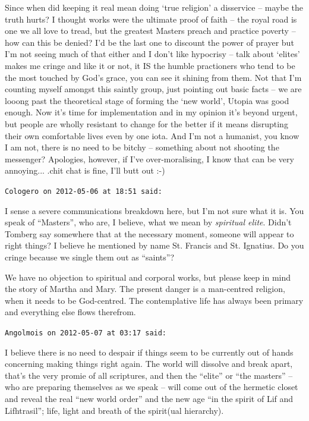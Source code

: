 \begin{footnotesize}
\begin{sffamily}
Since when did keeping it real mean doing `true religion' a disservice -- maybe the truth hurts? I thought works were the ultimate proof of faith -- the royal road is one we all love to tread, but the greatest Masters preach and practice poverty -- how can this be denied? I'd be the last one to discount the power of prayer but I'm not seeing much of that either and I don't like hypocrisy -- talk about `elites' makes me cringe and like it or not, it IS the humble practioners who tend to be the most touched by God's grace, you can see it shining from them. Not that I'm counting myself amongst this saintly group, just pointing out basic facts -- we are looong past the theoretical stage of forming the `new world', Utopia was good enough. Now it's time for implementation and in my opinion it's beyond urgent, but people are wholly resistant to change for the better if it means disrupting their own comfortable lives even by one iota. And I'm not a humanist, you know I am not, there is no need to be bitchy -- something about not shooting the messenger? Apologies, however, if I've over-moralising, I know that can be very annoying... .chit chat is fine, I'll butt out :-)

\hfill

\texttt{Cologero on 2012-05-06 at 18:51 said:}

I sense a severe communications breakdown here, but I'm not sure what it is. You speak of ``Masters'', who are, I believe, what we mean by \emph{spiritual elite}. Didn't Tomberg say somewhere that at the necessary moment, someone will appear to right things? I believe he mentioned by name St. Francis and St. Ignatius. Do you cringe because we single them out as ``saints''?

We have no objection to spiritual and corporal works, but please keep in mind the story of Martha and Mary. The present danger is a man-centred religion, when it needs to be God-centred. The contemplative life has always been primary and everything else flows therefrom.

\hfill

\texttt{Angolmois on 2012-05-07 at 03:17 said:}

I believe there is no need to despair if things seem to be currently out of hands concerning making things right again. The world will dissolve and break apart, that's the very promie of all scriptures, and then the ``elite'' or ``the masters'' -- who are preparing themselves as we speak -- will come out of the hermetic closet and reveal the real ``new world order'' and the new age ``in the spirit of Lif and Lifhtrasil''; life, light and breath of the spirit(ual hierarchy).


\end{sffamily}
\end{footnotesize}
